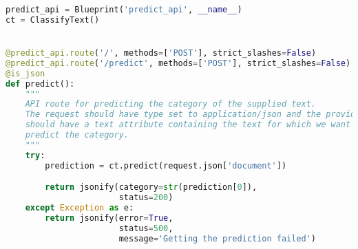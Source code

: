 \begin{lstlisting}[language=python, caption={Example code of a Blueprint used in the UrbanSearch system}, label={lst:blueprint}]
predict_api = Blueprint('predict_api', __name__)
ct = ClassifyText()


@predict_api.route('/', methods=['POST'], strict_slashes=False)
@predict_api.route('/predict', methods=['POST'], strict_slashes=False)
@is_json
def predict():
    """
    API route for predicting the category of the supplied text.
    The request should have type set to application/json and the provided JSON
    should have a text attribute containing the text for which we want to
    predict the category.
    """
    try:
        prediction = ct.predict(request.json['document'])

        return jsonify(category=str(prediction[0]),
                       status=200)
    except Exception as e:
        return jsonify(error=True,
                       status=500,
                       message='Getting the prediction failed')
\end{lstlisting}